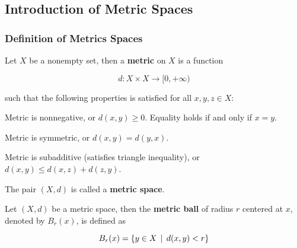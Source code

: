 \documentclass[a4paper,12pt]{article}
\begin{document}
\subsection{Introduction of Metric Spaces}
\subsubsection{Definition of Metrics Spaces}
\begin{dft}
  Let $X$ be a nonempty set, then a \textbf{metric} on $X$ is a function

  $$d:X\times X\to[0,+\infty)$$\s

  such that the following properties is satisfied for all $x,y,z\in X$:

  \begin{alist}
    \item Metric is nonnegative, or $d(x,y)\geq 0$. Equality holds if and only if $x=y$.
    \item Metric is symmetric, or $d(x,y)=d(y,x)$.
    \item Metric is subadditive (satisfies triangle inequality), or $d(x,y)\leq d(x,z)+d(z,y)$.
  \end{alist}

  The pair $(X,d)$ is called a \textbf{metric space}.
\end{dft}\n

\begin{dft}
  Let $(X,d)$ be a metric space, then the \textbf{metric ball} of radius $r$ centered at $x$, denoted by $B_{r}(x)$, is defined as

  $$B_{r}(x)=\left\{ y\in X\,\mid\, d(x,y)<r\right\}$$
\end{dft}
\end{document}
